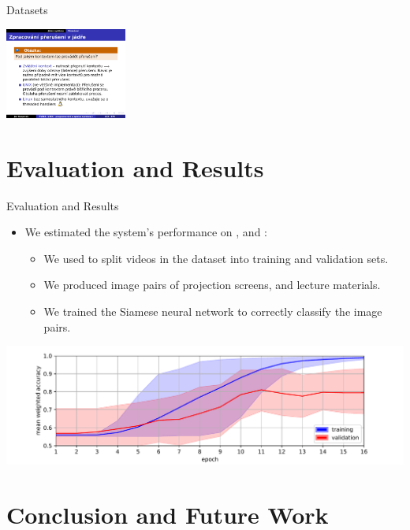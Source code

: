 \begin{frame}{Datasets }
\begin{center}
{  \includegraphics[width=0.3\textwidth]{figs/dataset-examples/beyond-bounds/slides01-12}%
}%
\end{center}
\end{frame}

\section{Evaluation and Results}

\begin{frame}{Evaluation and Results }
\begin{itemize}
\item We estimated the system's \alert{performance} on , and
  :
\begin{itemize}
\item We used \alert{} to split videos in the dataset into \alert{training and validation sets}.
\item We produced \alert{image pairs} of projection screens, and lecture materials.
\item We trained the Siamese neural network to correctly \alert{classify the image pairs}.
\end{itemize}
\end{itemize}

\begin{center}
\vspace{-0.2cm}%
\includegraphics[width=\textwidth]{figs/results/siamese-21}
\end{center}
\end{frame}

\section{Conclusion and Future Work}

